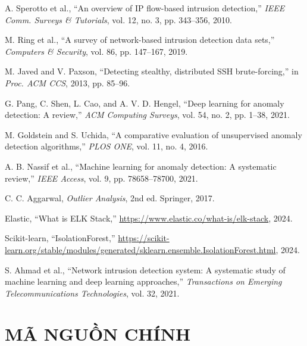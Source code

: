 \documentclass[13pt,a4paper,oneside]{report}
\begin{document}
\begin{enumerate}[label={[\arabic*]}]
\item A. Sperotto et al., ``An overview of IP flow-based intrusion detection,'' \textit{IEEE Comm. Surveys \& Tutorials}, vol. 12, no. 3, pp. 343--356, 2010.

\item M. Ring et al., ``A survey of network-based intrusion detection data sets,'' \textit{Computers \& Security}, vol. 86, pp. 147--167, 2019.

\item M. Javed and V. Paxson, ``Detecting stealthy, distributed SSH brute-forcing,'' in \textit{Proc. ACM CCS}, 2013, pp. 85--96.

\item G. Pang, C. Shen, L. Cao, and A. V. D. Hengel, ``Deep learning for anomaly detection: A review,'' \textit{ACM Computing Surveys}, vol. 54, no. 2, pp. 1--38, 2021.

\item M. Goldstein and S. Uchida, ``A comparative evaluation of unsupervised anomaly detection algorithms,'' \textit{PLOS ONE}, vol. 11, no. 4, 2016.

\item A. B. Nassif et al., ``Machine learning for anomaly detection: A systematic review,'' \textit{IEEE Access}, vol. 9, pp. 78658--78700, 2021.

\item C. C. Aggarwal, \textit{Outlier Analysis}, 2nd ed. Springer, 2017.

\item Elastic, ``What is ELK Stack,'' \url{https://www.elastic.co/what-is/elk-stack}, 2024.

\item Scikit-learn, ``IsolationForest,'' \url{https://scikit-learn.org/stable/modules/generated/sklearn.ensemble.IsolationForest.html}, 2024.

\item S. Ahmad et al., ``Network intrusion detection system: A systematic study of machine learning and deep learning approaches,'' \textit{Transactions on Emerging Telecommunications Technologies}, vol. 32, 2021.

\end{enumerate}

\appendix

\chapter{MÃ NGUỒN CHÍNH}
\end{document}

